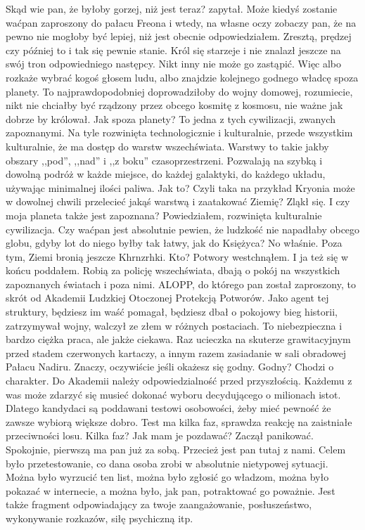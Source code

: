 \begin{dialogue}
\ds{} Skąd wie pan, że byłoby gorzej, niż jest teraz? \dm{} zapytał.
\ds{} Może kiedyś zostanie waćpan zaproszony do pałacu Freona i wtedy, na własne oczy zobaczy pan, że na pewno nie mogłoby być lepiej, niż jest obecnie \dm{} odpowiedziałem. \dm{}
Zresztą, prędzej czy później to i tak się pewnie stanie. Król się starzeje i nie znalazł jeszcze na swój tron odpowiedniego następcy. Nikt inny nie może go zastąpić.
Więc albo rozkaże wybrać kogoś głosem ludu, albo znajdzie kolejnego godnego władcę spoza planety. 
To najprawdopodobniej doprowadziłoby do wojny domowej, rozumiecie, nikt nie chciałby być rządzony przez obcego kosmitę z kosmosu, nie ważne jak dobrze by królował.
\ds{} Jak spoza planety? 
\ds{} To jedna z tych cywilizacji, zwanych zapoznanymi. Na tyle rozwinięta technologicznie i kulturalnie, przede wszystkim kulturalnie, 
że ma dostęp do warstw wszechświata. Warstwy to takie jakby obszary ,,pod'', ,,nad'' i ,,z boku'' czasoprzestrzeni.
Pozwalają na szybką i dowolną podróż w każde miejsce, do każdej galaktyki, do każdego układu, używając minimalnej ilości paliwa.
\ds{} Jak to? Czyli taka na przykład Kryonia może w dowolnej chwili przelecieć jakąś warstwą i zaatakować Ziemię? 
\dm{} Zląkł się. \dm{} I czy moja planeta także jest zapoznana?
\ds{} Powiedziałem, rozwinięta kulturalnie cywilizacja. Czy waćpan jest absolutnie pewien, że ludzkość nie napadłaby obcego globu, gdyby lot do niego byłby tak łatwy, jak do Księżyca?
No właśnie. Poza tym, Ziemi bronią jeszcze Khrnzrhki.
\ds{} Kto? 
\ds{} Potwory \dm{} westchnąłem. I ja też się w końcu poddałem. \dm{} Robią za policję wszechświata, dbają o pokój na wszystkich zapoznanych światach i poza nimi. 
ALOPP, do którego pan został zaproszony, to skrót od Akademii Ludzkiej Otoczonej Protekcją Potworów. 
Jako agent tej struktury, będziesz im waść pomagał, będziesz dbał o pokojowy bieg historii, zatrzymywał wojny, walczył ze złem w różnych postaciach. 
To niebezpieczna i bardzo ciężka praca, ale jakże ciekawa.
Raz ucieczka na skuterze grawitacyjnym przed stadem czerwonych kartaczy, a innym razem zasiadanie w sali obradowej Pałacu Nadiru. 
Znaczy, oczywiście jeśli okażesz się godny.
\ds{} Godny?
\ds{} Chodzi o charakter. Do Akademii należy odpowiedzialność przed przyszłością. 
Każdemu z was może zdarzyć się musieć dokonać wyboru decydującego o milionach istot. 
Dlatego kandydaci są poddawani testowi osobowości, żeby mieć pewność że zawsze wybiorą większe dobro. 
Test ma kilka faz, sprawdza reakcję na zaistniałe przeciwności losu.
\ds{} Kilka faz? Jak mam je pozdawać? \dm{} Zaczął panikować.
\ds{} Spokojnie, pierwszą ma pan już za sobą. Przecież jest pan tutaj z nami. 
Celem było przetestowanie, co dana osoba zrobi w absolutnie nietypowej sytuacji.
Można było wyrzucić ten list, można było zgłosić go władzom, można było pokazać w internecie, a można było, jak pan, potraktować go poważnie.
Jest także fragment odpowiadający za twoje zaangażowanie, posłuszeństwo, wykonywanie rozkazów, siłę psychiczną itp.
\end{dialogue}

